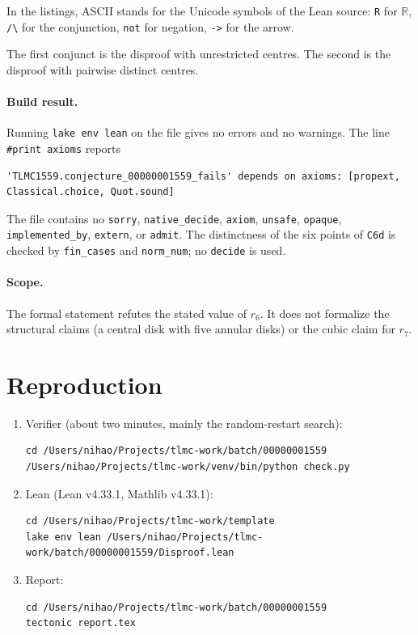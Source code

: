 \documentclass[11pt]{article}
\theoremstyle{definition}
\theoremstyle{plain}
\begin{document}
In the listings, ASCII stands for the Unicode symbols of the Lean source: \texttt{R} for $\mathbb{R}$, \texttt{/\textbackslash} for the conjunction, \texttt{not} for negation, \texttt{->} for the arrow.

The first conjunct is the disproof with unrestricted centres. The second is the disproof with pairwise distinct centres.

\paragraph{Build result.} Running \texttt{lake env lean} on the file gives no errors and no warnings. The line \texttt{\#print axioms} reports
\begin{center}
{\small\begin{lstlisting}
'TLMC1559.conjecture_00000001559_fails' depends on axioms: [propext, Classical.choice, Quot.sound]
\end{lstlisting}}
\end{center}
The file contains no \texttt{sorry}, \texttt{native\_decide}, \texttt{axiom}, \texttt{unsafe}, \texttt{opaque}, \texttt{implemented\_by}, \texttt{extern}, or \texttt{admit}. The distinctness of the six points of \texttt{C6d} is checked by \texttt{fin\_cases} and \texttt{norm\_num}; no \texttt{decide} is used.

\paragraph{Scope.} The formal statement refutes the stated value of $r_6$. It does not formalize the structural claims (a central disk with five annular disks) or the cubic claim for $r_7$.

\section{Reproduction}

\begin{enumerate}
  \item Verifier (about two minutes, mainly the random-restart search):
  \begin{lstlisting}
cd /Users/nihao/Projects/tlmc-work/batch/00000001559
/Users/nihao/Projects/tlmc-work/venv/bin/python check.py
  \end{lstlisting}
  \item Lean (Lean v4.33.1, Mathlib v4.33.1):
  \begin{lstlisting}
cd /Users/nihao/Projects/tlmc-work/template
lake env lean /Users/nihao/Projects/tlmc-work/batch/00000001559/Disproof.lean
  \end{lstlisting}
  \item Report:
  \begin{lstlisting}
cd /Users/nihao/Projects/tlmc-work/batch/00000001559
tectonic report.tex
  \end{lstlisting}
\end{enumerate}
\end{document}
